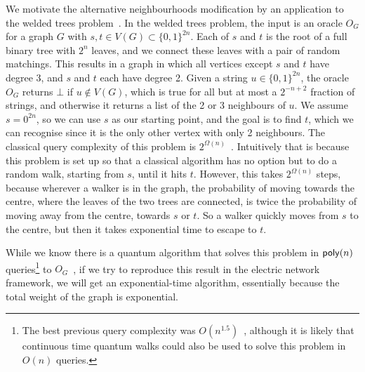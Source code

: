 \documentclass{article}
\renewcommand{\>}{\rangle}
\newcommand{\<}{\langle}
\renewcommand{\(}{\left(}
\renewcommand{\)}{\right)}
\begin{document}
We motivate the alternative neighbourhoods modification by an application to the welded trees problem~\cite{childs2003ExpSpeedupQW}. In the welded trees problem, the input is an oracle $O_G$ for a graph $G$ with $s,t\in V(G)\subset \{0,1\}^{2n}$. Each of $s$ and $t$ is the root of a full binary tree with $2^n$ leaves, and we connect these leaves with a pair of random matchings. This results in a graph in which all vertices except $s$ and $t$ have degree 3, and $s$ and $t$ each have degree 2. Given a string $u\in\{0,1\}^{2n}$, the oracle $O_G$ returns $\bot$ if $u\not\in V(G)$, which is true for all but at most a $2^{-n+2}$ fraction of strings, and otherwise it returns a list of the 2 or 3 neighbours of $u$. We assume $s=0^{2n}$, so we can use $s$ as our starting point, and the goal is to find $t$, which we can recognise since it is the only other vertex with only 2 neighbours. The classical query complexity of this problem is $2^{\Omega(n)}$~\cite{childs2003ExpSpeedupQW}. Intuitively that is because this problem is set up so that a classical algorithm has no option but to do a random walk, starting from $s$, until it hits $t$. However, this takes $2^{\Omega(n)}$ steps, because wherever a walker is in the graph, the probability of moving towards the centre, where the leaves of the two trees are connected, is twice the probability of moving away from the centre, towards $s$ or $t$. So a walker quickly moves from $s$ to the centre, but then it takes exponential time to escape to $t$. 

While we know there is a quantum algorithm that solves this problem in ${\sf poly}(n)$ queries\footnote{The best previous query complexity was $O(n^{1.5})$~\cite{atia2021welded}, although it is likely that continuous time quantum walks could also be used to solve this problem in $O(n)$ queries.} to $O_G$~\cite{childs2003ExpSpeedupQW}, if we try to reproduce this result in the electric network framework, we will get an exponential-time algorithm, essentially because the total weight of the graph is exponential. 
\end{document}
